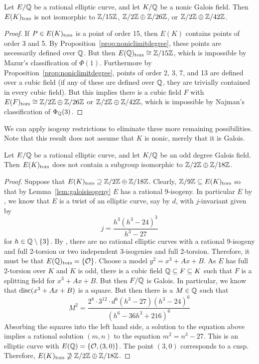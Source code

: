 \begin{lem} \label{degreelimitelim}
Let $E/\mathbb{Q}$ be a rational elliptic curve, and let $K/\mathbb{Q}$ be a nonic Galois field. Then $E(K)_{\text{tors}}$ is not isomorphic to $\mathbb{Z}/15\mathbb{Z}$, $\mathbb{Z}/2\mathbb{Z} \oplus \mathbb{Z}/26\mathbb{Z}$, or $\mathbb{Z}/2\mathbb{Z} \oplus \mathbb{Z}/42\mathbb{Z}$.
\end{lem}

\begin{proof} 
If $P \in E(K)_{\text{tors}}$ is a point of order 15, then $E(K)$ contains points of order 3 and 5. By Proposition~\ref{prop:noniclimitdegree}, these points are necessarily defined over $\mathbb{Q}$. But then $E(\mathbb{Q})_{\text{tors}} \cong \mathbb{Z}/15\mathbb{Z}$, which is impossible by Mazur's classification of $\Phi(1)$. Furthermore by Proposition~\ref{prop:noniclimitdegree}, points of order 2, 3, 7, and 13 are defined over a cubic field (if any of these are defined over $\mathbb{Q}$, they are trivially contained in every cubic field). But this implies there is a cubic field $F$ with $E(F)_{\text{tors}} \cong \mathbb{Z}/2\mathbb{Z} \oplus \mathbb{Z}/26\mathbb{Z}$ or $\mathbb{Z}/2\mathbb{Z} \oplus \mathbb{Z}/42\mathbb{Z}$, which is impossible by Najman's classification of $\Phi_{\mathbb{Q}}(3)$. 
\end{proof}


We can apply isogeny restrictions to eliminate three more remaining possibilities. Note that this result does not assume that $K$ is nonic, merely that it is Galois. 


\begin{lem} \label{lem:no6-18}
Let $E/\mathbb{Q}$ be a rational elliptic curve, and let $K/\mathbb{Q}$ be an odd degree Galois field. Then $E(K)_{\text{tors}}$ does not contain a subgroup isomorphic to $\mathbb{Z}/2\mathbb{Z} \oplus \mathbb{Z}/18\mathbb{Z}$. 
\end{lem}

\begin{proof}
Suppose that $E(K)_{\text{tors}} \supseteq \mathbb{Z}/2\mathbb{Z} \oplus \mathbb{Z}/18\mathbb{Z}$. Clearly, $\mathbb{Z}/9\mathbb{Z} \subseteq E(K)_{\text{tors}}$ so that by Lemma~\ref{lem:galoisisogeny} $E$ has a rational 9-isogeny. In particular $E$ by \cite{lozanorobledo13}, we know that $E$ is a twist of an elliptic curve, say by $d$, with $j$-invariant given by
	\[
	j= \dfrac{h^3 (h^3 - 24)^3}{h^3 - 27}
	\]
for $h \in \mathbb{Q} \setminus \{ 3 \}$. By \cite[Table~2,Prop.~III.2.3]{kubert76}, there are no rational elliptic curves with a rational 9-isogeny and full 2-torsion or two independent 3-isogenies and full 2-torsion. Therefore, it must be that $E(\mathbb{Q})_{\text{tors}}= \{ \mathcal{O} \}$. Choose a model $y^2= x^3 + Ax + B$. As $E$ has full 2-torsion over $K$ and $K$ is odd, there is a cubic field $\mathbb{Q} \subseteq F \subseteq K$ such that $F$ is a splitting field for $x^3 + Ax + B$. But then $F/\mathbb{Q}$ is Galois. In particular, we know that $\operatorname{disc}(x^3 + Ax + B)$ is a square. But then there is a $M \in \mathbb{Q}$ such that	
	\[
	M^2= \dfrac{2^8 \cdot 3^{12} \cdot d^6 (h^3 - 27) ( h^3 - 24)^6}{(h^6 - 36h^3 + 216)^6}
	\]
Absorbing the squares into the left hand side, a solution to the equation above implies a rational solution $(m,n)$ to the equation $m^2= n^3 - 27$. This is an elliptic curve with $E(\mathbb{Q})= \{ \mathcal{O}, (3,0) \}$. The point $(3,0)$ corresponds to a cusp. Therefore, $E(K)_{\text{tors}} \not\supseteq \mathbb{Z}/2\mathbb{Z} \oplus \mathbb{Z}/18\mathbb{Z}$. 
\end{proof}


